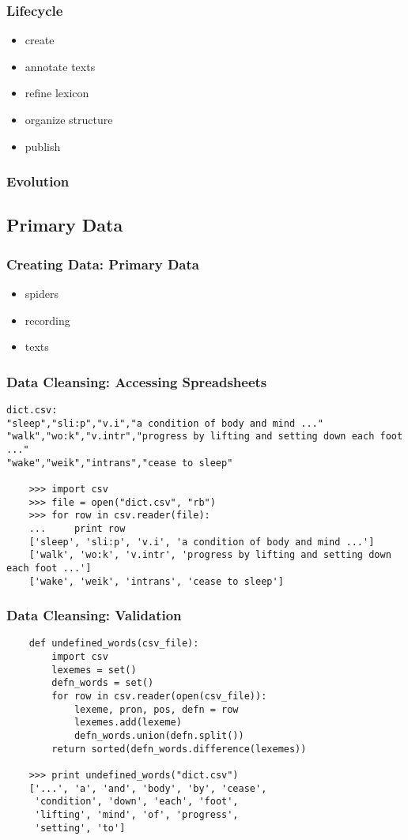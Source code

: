 \documentclass{beamer}             %
\begin{document}
\begin{frame}
\frametitle{Lifecycle}

\begin{itemize}
\item create
\item annotate texts
\item refine lexicon
\item organize structure
\item publish
\end{itemize}
\end{frame}

\begin{frame}
\frametitle{Evolution}
\end{frame}

\subsection{Primary Data}

\begin{frame}
\frametitle{Creating Data: Primary Data}

\begin{itemize}
\item spiders
\item recording
\item texts
\end{itemize}
\end{frame}

\begin{frame}[fragile]
\frametitle{Data Cleansing: Accessing Spreadsheets}
\scriptsize
\begin{verbatim}
dict.csv:
"sleep","sli:p","v.i","a condition of body and mind ..."
"walk","wo:k","v.intr","progress by lifting and setting down each foot ..."
"wake","weik","intrans","cease to sleep"

    >>> import csv
    >>> file = open("dict.csv", "rb")
    >>> for row in csv.reader(file):
    ...     print row
    ['sleep', 'sli:p', 'v.i', 'a condition of body and mind ...']
    ['walk', 'wo:k', 'v.intr', 'progress by lifting and setting down each foot ...']
    ['wake', 'weik', 'intrans', 'cease to sleep']
\end{verbatim}
\end{frame}

\begin{frame}[fragile]
\frametitle{Data Cleansing: Validation}
\small
\begin{verbatim}
    def undefined_words(csv_file):
        import csv
        lexemes = set()
        defn_words = set()
        for row in csv.reader(open(csv_file)):
            lexeme, pron, pos, defn = row
            lexemes.add(lexeme)
            defn_words.union(defn.split())
        return sorted(defn_words.difference(lexemes))
        
    >>> print undefined_words("dict.csv")
    ['...', 'a', 'and', 'body', 'by', 'cease',
     'condition', 'down', 'each', 'foot',
     'lifting', 'mind', 'of', 'progress',
     'setting', 'to']
\end{verbatim}
\end{frame}
\end{document}
